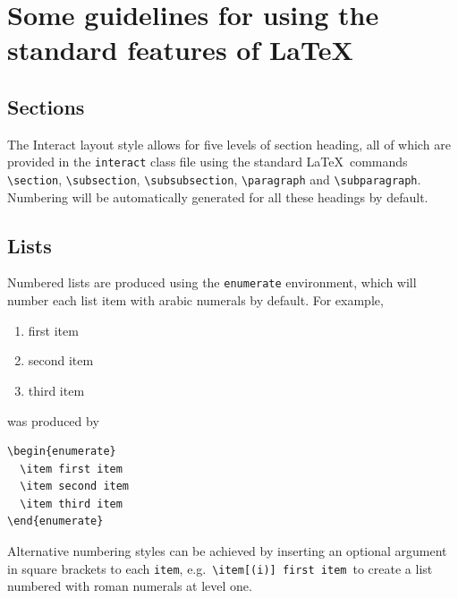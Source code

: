 \documentclass[]{interact}
\theoremstyle{plain}%
\theoremstyle{definition}
\theoremstyle{remark}
\begin{document}
\section{Some guidelines for using the standard features of \LaTeX}

\subsection{Sections}

The \textsf{Interact} layout style allows for five levels of section heading, all of which are provided in the \texttt{interact} class file using the standard \LaTeX\ commands \verb"\section", \verb"\subsection", \verb"\subsubsection", \verb"\paragraph" and \verb"\subparagraph". Numbering will be automatically generated for all these headings by default.


\subsection{Lists}

Numbered lists are produced using the \texttt{enumerate} environment, which will number each list item with arabic numerals by default. For example,
\begin{enumerate}
  \item first item
  \item second item
  \item third item
\end{enumerate}
was produced by
\begin{verbatim}
\begin{enumerate}
  \item first item
  \item second item
  \item third item
\end{enumerate}
\end{verbatim}
Alternative numbering styles can be achieved by inserting an optional argument in square brackets to each \verb"item", e.g.\ \verb"\item[(i)] first item"\, to create a list numbered with roman numerals at level one.
\end{document}
